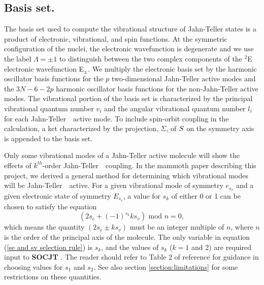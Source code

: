 \documentclass{article}
\newcommand{\JT}{Jahn-Teller\ }
\newcommand{\socjt}{{\bf SOCJT }}
\begin{document}
\subsection{Basis set.} The basis set used to compute the vibrational 
structure of Jahn-Teller states is a product of electronic, vibrational,
and spin functions. At the symmetric configuration of the nuclei, 
the electronic wavefunction is degenerate and we use the label
$\Lambda = \pm 1$ to distinguish between the 
two complex components of the $^2$E electronic wavefunction E$_\pm$. 
We multiply the electronic basis set by the harmonic oscillator basis
functions for the $p$ two-dimensional Jahn-Teller active modes and the
$3N-6-2p$ harmonic oscillator basis functions for the non-Jahn-Teller
active modes. The vibrational portion of the basis set is
characterized by the principal vibrational quantum number $v_i$ and
the angular vibrational quantum number $l_i$ for each \JT\ active mode.
To include spin-orbit coupling in the calculation,
a ket characterized by the projection, $\Sigma $, of ${\bf S}$ on the 
symmetry axis is appended to the basis set.

Only some vibrational modes of a Jahn-Teller active molecule will show
the effects of $k^{th}$-order \JT\ coupling. In the mammoth paper
describing this 
project, we derived a general method for determining which vibrational
modes will be \JT\ active. For a given vibrational mode of symmetry
$e_{s_v}$ and  a given electronic state of symmetry $E_{s_e}$, a value
for $s_k$ of either 0 or 1 can be chosen to satisfy the equation
\begin{equation}
\left( 2s_e + (-1)^{s_k } ks_v \right) \text{ mod } n=0,
\label{se and sv selection rule}
\end{equation}
which means the quantity $\left( 2s_e \pm ks_v \right) $
must be an integer multiple of $n$, where $n$ is the order of the
principal axis of the molecule. The only variable in equation (\ref{se
  and sv selection rule}) is $s_k$, and the values of $s_k$ ($k=1$ and 2)
are required input to \socjt . The reader should refer to Table 2 of
reference  for guidance in choosing values for $s_1$ and
$s_2$. See also section \ref{section:limitations} for some
restrictions on these quantities.
\end{document}
